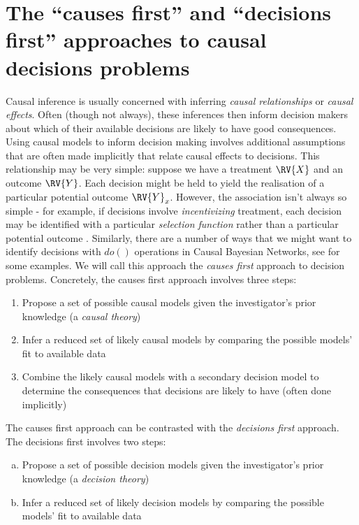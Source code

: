\section{The ``causes first'' and ``decisions first'' approaches to causal decisions problems}




Causal inference is usually concerned with inferring \emph{causal relationships} or \emph{causal effects}. Often (though not always), these inferences then inform decision makers about which of their available decisions are likely to have good consequences. Using causal models to inform decision making involves additional assumptions that are often made implicitly that relate causal effects to decisions. This relationship may be very simple: suppose we have a treatment $\RV{X}$ and an outcome $\RV{Y}$. Each decision might be held to yield the realisation of a particular potential outcome $\RV{Y}_x$. However, the association isn't always so simple - for example, if decisions involve \emph{incentivizing} treatment, each decision may be identified with a particular \emph{selection function} rather than a particular potential outcome \citep{heckman_policy-relevant_2001}. Similarly, there are a number of ways that we might want to identify decisions with $do()$ operations in Causal Bayesian Networks, see \citet{pearl_does_2018} for some examples. We will call this approach the \emph{causes first} approach to decision problems. Concretely, the causes first approach involves three steps:

\begin{enumerate}[(1)]
	\item Propose a set of possible causal models given the investigator's prior knowledge (a \emph{causal theory})
	\item Infer a reduced set of likely causal models by comparing the possible models' fit to available data
	\item Combine the likely causal models with a secondary decision model to determine the consequences that decisions are likely to have (often done implicitly)
\end{enumerate}

The causes first approach can be contrasted with the \emph{decisions first} approach. The decisions first involves two steps:

\begin{enumerate}[(a)]
	\item Propose a set of possible decision models given the investigator's prior knowledge (a \emph{decision theory})
	\item Infer a reduced set of likely decision models by comparing the possible models' fit to available data
\end{enumerate}

